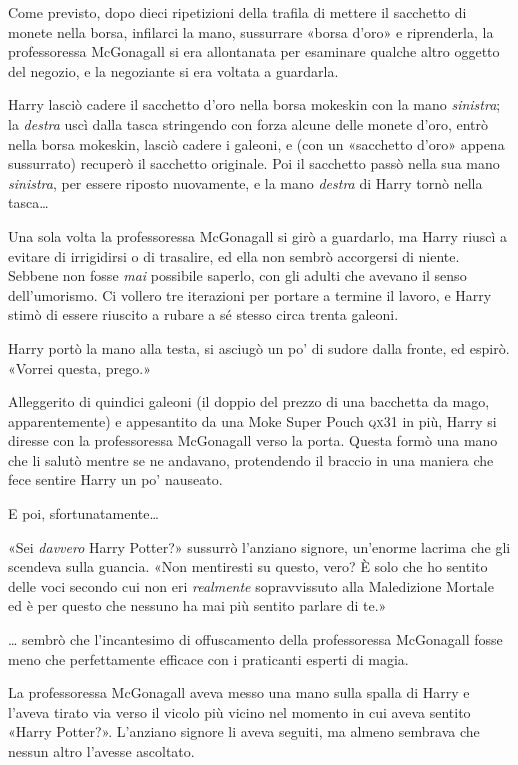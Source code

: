 Come previsto, dopo dieci ripetizioni della trafila di mettere il sacchetto di monete nella borsa, infilarci la mano, sussurrare «borsa d’oro» e riprenderla, la professoressa McGonagall si era allontanata per esaminare qualche altro oggetto del negozio, e la negoziante si era voltata a guardarla.

Harry lasciò cadere il sacchetto d’oro nella borsa mokeskin con la mano \textit{sinistra}; la \textit{destra} uscì dalla tasca stringendo con forza alcune delle monete d’oro, entrò nella borsa mokeskin, lasciò cadere i galeoni, e (con un «sacchetto d’oro» appena sussurrato) recuperò il sacchetto originale. Poi il sacchetto passò nella sua mano \textit{sinistra}, per essere riposto nuovamente, e la mano \textit{destra} di Harry tornò nella tasca…

Una sola volta la professoressa McGonagall si girò a guardarlo, ma Harry riuscì a evitare di irrigidirsi o di trasalire, ed ella non sembrò accorgersi di niente. Sebbene non fosse \textit{mai} possibile saperlo, con gli adulti che avevano il senso dell’umorismo. Ci vollero tre iterazioni per portare a termine il lavoro, e Harry stimò di essere riuscito a rubare a sé stesso circa trenta galeoni.

Harry portò la mano alla testa, si asciugò un po’ di sudore dalla fronte, ed espirò. «Vorrei questa, prego.»

Alleggerito di quindici galeoni (il doppio del prezzo di una bacchetta da mago, apparentemente) e appesantito da una Moke Super Pouch \textsc{qx}31 in più, Harry si diresse con la professoressa McGonagall verso la porta. Questa formò una mano che li salutò mentre se ne andavano, protendendo il braccio in una maniera che fece sentire Harry un po’ nauseato.

E poi, sfortunatamente…

«Sei \textit{davvero} Harry Potter?» sussurrò l’anziano signore, un’enorme lacrima che gli scendeva sulla guancia. «Non mentiresti su questo, vero? È solo che ho sentito delle voci secondo cui non eri \textit{realmente} sopravvissuto alla Maledizione Mortale ed è per questo che nessuno ha mai più sentito parlare di te.»

… sembrò che l’incantesimo di offuscamento della professoressa McGonagall fosse meno che perfettamente efficace con i praticanti esperti di magia.

La professoressa McGonagall aveva messo una mano sulla spalla di Harry e l’aveva tirato via verso il vicolo più vicino nel momento in cui aveva sentito «Harry Potter?». L’anziano signore li aveva seguiti, ma almeno sembrava che nessun altro l’avesse ascoltato.


